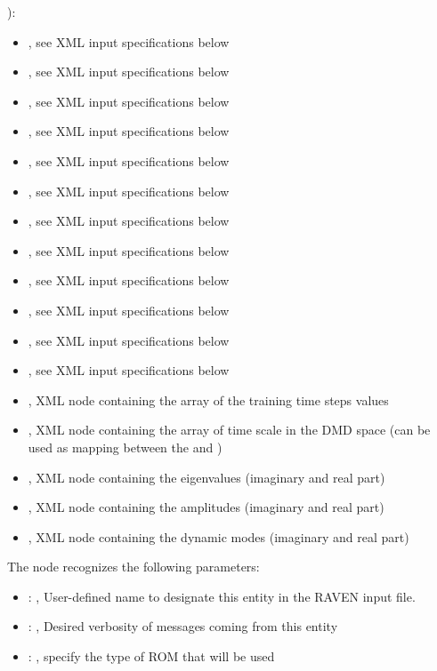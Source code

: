   ):     \begin{itemize}       \item {}, see XML input
  specifications below       \item {}, see XML input specifications below
  \item {}, see XML input specifications below       \item {},
  see XML input specifications below       \item {}, see XML input
  specifications below       \item {}, see XML input specifications below
  \item {}, see XML input specifications below       \item
  , see XML input specifications below       \item {},
  see XML input specifications below       \item {}, see XML input
  specifications below       \item {}, see XML input specifications below
  \item {}, see XML input specifications below       \item {}, XML
  node containing the array of the training time steps values       \item {},
  XML node containing the array of time scale in the DMD space (can be used as mapping       between
  the   and )       \item {}, XML node
  containing the eigenvalues (imaginary and real part)       \item {}, XML node
  containing the amplitudes (imaginary and real part)       \item {}, XML node
  containing the dynamic modes (imaginary and real part)     \end{itemize}

  The  node recognizes the following parameters:
    \begin{itemize}
      \item {}: ,
        User-defined name to designate this entity in the RAVEN input file.
      \item {}: ,
        Desired verbosity of messages coming from this entity
      \item {}: ,
        specify the type of ROM that will be used
  \end{itemize}

